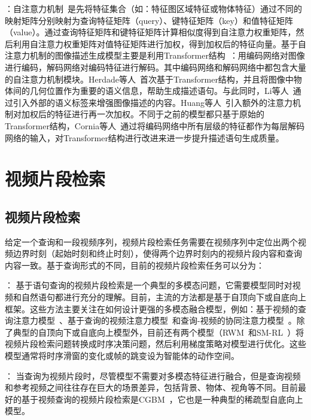 \textbf{}：自注意力机制~\cite{vaswani2017attention}是先将特征集合（如：特征图区域特征或物体特征）通过不同的映射矩阵分别映射为查询特征矩阵（query）、键特征矩阵（key）和值特征矩阵（value）。通过查询特征矩阵和键特征矩阵计算相似度得到自注意力权重矩阵，然后利用自注意力权重矩阵对值特征矩阵进行加权，得到加权后的特征向量。基于自注意力机制的图像描述生成模型主要是利用Transformer结构~\cite{vaswani2017attention}：用编码网络对图像进行编码，解码网络对编码特征进行解码。其中编码网络和解码网络中都包含大量的自注意力机制模块。Herdade等人~\cite{herdade2019image}首次基于Transformer结构，并且将图像中物体间的几何位置作为重要的语义信息，帮助生成描述语句。与此同时，Li等人~\cite{li2019entangled}通过引入外部的语义标签来增强图像描述的内容。Huang等人~\cite{huang2019attention}引入额外的注意力机制对加权后的特征进行再一次加权。不同于之前的模型都只基于原始的Transformer结构，Cornia等人~\cite{cornia2020m}通过将编码网络中所有层级的特征都作为每层解码网络的输入，对Transformer结构进行改进来进一步提升描述语句生成质量。


\section{视频片段检索}

\subsection{视频片段检索}

给定一个查询和一段视频序列，视频片段检索任务需要在视频序列中定位出两个视频边界时刻（起始时刻和终止时刻），使得两个边界时刻内的视频片段内容和查询内容一致。基于查询形式的不同，目前的视频片段检索任务可以分为：

\textbf{}：
基于语句查询的视频片段检索是一个典型的多模态问题，它需要模型同时对视频和自然语句都进行充分的理解。目前，主流的方法都是基于自顶向下或自底向上框架。这些方法主要关注在如何设计更强的多模态融合模型，例如：基于视频的查询注意力模型~\cite{liu2018attentive}、基于查询的视频注意力模型~\cite{liu2018cross}和查询-视频的协同注意力模型~\cite{chen2018temporally,chen2019localizing,yuan2019find}。除了典型的自顶向下或自底向上模型外，目前还有两个模型（RWM~\cite{he2019read}和SM-RL~\cite{wang2019language}）将视频片段检索问题转换成时序决策问题，然后利用梯度策略对模型进行优化。这些模型通常将时序滑窗的变化或帧的跳变设为智能体的动作空间。

\textbf{}：
当查询为视频片段时，尽管模型不需要对多模态特征进行融合，但是查询视频和参考视频之间往往存在巨大的场景差异，包括背景、物体、视角等不同。目前最好的基于视频查询的视频片段检索是CGBM~\cite{feng2018video}，它也是一种典型的稀疏型自底向上模型。


